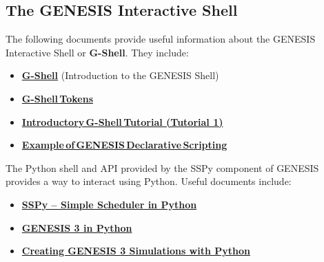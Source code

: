 \documentclass[12pt]{article}
\begin{document}
\subsection*{The GENESIS Interactive Shell}

The following documents provide useful information about the GENESIS Interactive Shell or {\bf G-Shell}. They include:

\begin{itemize}
\item \href{../gshell/gshell.tex}{\bf G-Shell} (Introduction to the GENESIS Shell)
\item \href{../shell-tokens/shell-tokens.tex}{\bf G-Shell\,Tokens}
\item \href{../tutorial1/tutorial1.tex}{\bf Introductory\,G-Shell\,Tutorial (Tutorial 1)}
\item \href{../example-script1/example-script1.tex}{\bf Example\,of\,GENESIS\,Declarative\,Scripting}
\end{itemize}

The Python shell and API provided by the SSPy component of GENESIS
provides a way to interact using Python.  Useful documents include:

\begin{itemize}
\item \href{../sspy/sspy.tex}{\bf SSPy -- Simple Scheduler in Python}
\item \href{../g3-python/g3-python.tex}{\bf GENESIS 3 in Python}
\item \href{../tutorial-python-scripting/tutorial-python-scripting.html}{\bf
       Creating GENESIS 3 Simulations with Python}
\end{itemize}
\end{document}
